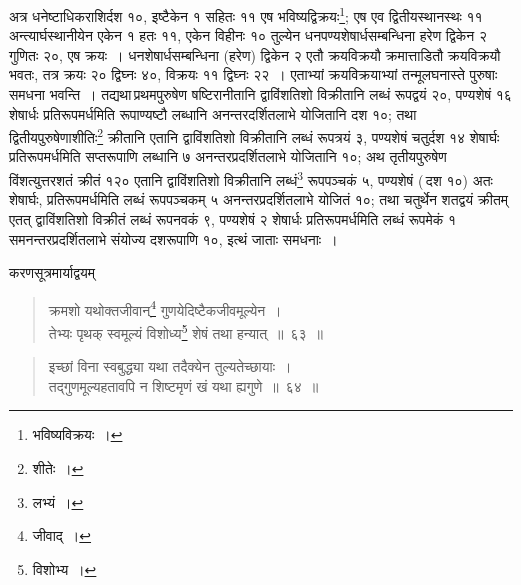 \documentclass[10pt, openany]{book}
\begin{document}
{{{अत्र धनेष्टाधिकराशिर्दश १०, इष्टैकेन १ सहितः ११ एष
भविष्यद्विक्रयः\renewcommand{\thefootnote}{\s ३}\footnote{\s भविष्यविक्रयः~।}; एष}
{एव द्वितीयस्थानस्थः ११ अन्त्यार्घस्थानीयेन एकेन १ हतः ११, एकेन विहीनः
१० तुल्येन}
{धनपण्यशेषार्धसम्बन्धिना हरेण द्विकेन २ गुणितः २०, एष क्रयः~।
धनशेषार्धसम्बन्धिना (हरेण)}
{द्विकेन २ एतौ क्रयविक्रयौ क्रमात्ताडितौ क्रयविक्रयौ भवतः, तत्र क्रयः २०
द्विघ्नः ४०, विक्रयः ११}
{द्विघ्नः २२~। एताभ्यां क्रयविक्रयाभ्यां तन्मूलघनास्ते पुरुषाः समधना
भवन्ति~। तद्यथा\textendash \,प्रथमपुरुषेण षष्टिरानीतानि द्वाविंशतिशो विक्रीतानि लब्धं रूपद्वयं २०,
पण्यशेषं १६ शेषार्धः} 
{प्रतिरूपमर्धमिति रूपाण्यष्टौ लब्धानि अनन्तरदर्शितलाभे योजितानि दश १०;
तथा द्वितीयपुरुषेणाशीतिः\renewcommand{\thefootnote}{\s ४}\footnote{\s *शीतेः~।}  क्रीतानि एतानि द्वाविंशतिशो विक्रीतानि लब्धं
रूपत्रयं ३, पण्यशेषं चतुर्दश}
{१४ शेषार्घः प्रतिरूपमर्धमिति सप्तरूपाणि लब्धानि ७ अनन्तरप्रदर्शितलाभे
योजितानि १०;}
{अथ तृतीयपुरुषेण विंशत्युत्तरशतं क्रीतं १२० एतानि द्वाविंशतिशो
विक्रीतानि लब्धं\renewcommand{\thefootnote}{\s ५}\footnote{\s लभ्यं~।} रूपपञ्चकं ५, पण्यशेषं (\,दश १०) अतः शेषार्घः, प्रतिरूपमर्धमिति लब्धं
रूपपञ्चकम् ५}
{अनन्तरप्रदर्शितलाभे योजितं १०; तथा चतुर्थेन शतद्वयं क्रीतम् एतत्
द्वाविंशतिशो विक्रीतं लब्धं}
{रूपनवकं ९, पण्यशेषं २ शेषार्धः प्रतिरूपमर्धमिति लब्धं रूपमेकं १
समनन्तरप्रदर्शितलाभे}
{संयोज्य दशरूपाणि १०, इत्थं जाताः समधनाः~।}
\vspace{3mm}

{करणसूत्रमार्याद्वयम्\textemdash}

\begin{quote}
    
{\bs क्रमशो यथोक्तजीवान्\renewcommand{\thefootnote}{\s ६}\footnote{\s *जीवाद्~।}  गुणयेदिष्टैकजीवमूल्येन~। \\
 तेभ्यः पृथक् स्वमूल्यं विशोध्य\renewcommand{\thefootnote}{\s ७}\footnote{\s विशोभ्य~।} शेषं तथा हन्यात्~॥~६३~॥}\end{quote}


\newpage

\begin{quote}
    
{\bs  इच्छां विना स्वबुद्ध्या यथा तदैक्येन तुल्यतेच्छायाः~। \\
 तद्गुणमूल्यहतावपि न शिष्टमृणं खं यथा ह्यगुणे~॥~६४~॥} \end{quote}

}}
\end{document}
